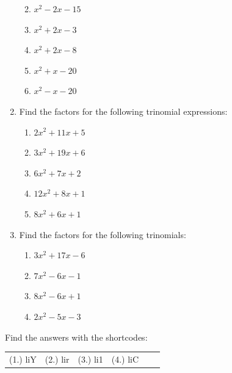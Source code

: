 \begin{enumerate}[noitemsep, label=\textbf{\arabic*}. ]
\begin{enumerate}[noitemsep, label=\textbf{\alph*}. ]
            \label{m39394*uid32}\item ${x}^{2}-2x-15$\label{m39394*uid33}\item ${x}^{2}+2x-3$\label{m39394*uid34}\item ${x}^{2}+2x-8$\label{m39394*uid35}\item ${x}^{2}+x-20$\label{m39394*uid36}\item ${x}^{2}-x-20$
\newline
\newline
\end{enumerate}
        \label{m39394*uid37}\item Find the factors for the following trinomial expressions:
\label{m39394*id277980}\begin{enumerate}[noitemsep, label=\textbf{\alph*}. ] 
            \label{m39394*uid38}\item $2{x}^{2}+11x+5$\label{m39394*uid39}\item $3{x}^{2}+19x+6$\label{m39394*uid40}\item $6{x}^{2}+7x+2$\label{m39394*uid41}\item $12{x}^{2}+8x+1$\label{m39394*uid42}\item $8{x}^{2}+6x+1$
\newline
\newline
\end{enumerate}
        \label{m39394*uid43}\item Find the factors for the following trinomials:
\label{m39394*id278184}\begin{enumerate}[noitemsep, label=\textbf{\alph*}. ] 
            \label{m39394*uid44}\item $3{x}^{2}+17x-6$\label{m39394*uid45}\item $7{x}^{2}-6x-1$\label{m39394*uid46}\item $8{x}^{2}-6x+1$\label{m39394*uid47}\item $2{x}^{2}-5x-3$
\newline
\newline
\end{enumerate}
        \end{enumerate}
    \label{m39394*cid6}
\par {} Find the answers with the shortcodes:
 \par \begin{tabular}[h]{cccccc}
 (1.) liY  &  (2.) lir  &  (3.) li1  &  (4.) liC  & \end{tabular}
